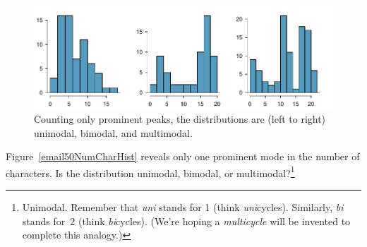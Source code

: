 \begin{doublespace}
\begin{figure}[h]
	\centering
	\includegraphics[width=\textwidth]{ch_intro_to_data_oi_biostat/figures/singleBiMultiModalPlots/singleBiMultiModalPlots}
	\caption{Counting only prominent peaks, the distributions are (left to right) unimodal, bimodal, and multimodal.}
	\label{singleBiMultiModalPlots}
\end{figure}

\begin{exercise}
	Figure~\ref{email50NumCharHist} reveals only one prominent mode in the number of characters. Is the distribution unimodal, bimodal, or multimodal?\footnote{Unimodal. Remember that \emph{uni} stands for 1 (think \emph{uni}cycles). Similarly, \emph{bi} stands for~2 (think \emph{bi}cycles). (We're hoping a \emph{multicycle} will be invented to complete this analogy.)} %
\end{exercise}

\end{doublespace}
